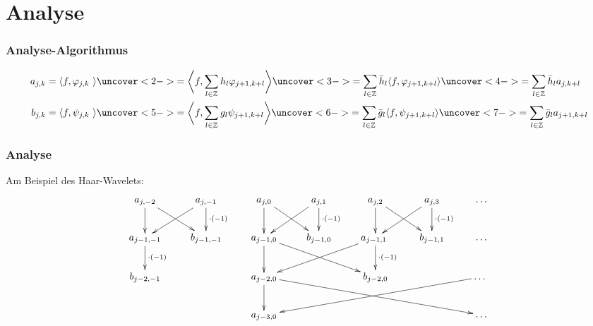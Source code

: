 %
%
%
\section{Analyse}

\begin{frame}
\frametitle{Analyse-Algorithmus}
\begin{align*}
a_{j,k} 
=
\langle f,\varphi_{j,k} \rangle
&\uncover<2->{=
\biggl\langle
f,\sum_{l\in\mathbb Z} h_l\varphi_{j+1,k+l}
\biggr\rangle}
\uncover<3->{=
\sum_{l\in\mathbb Z} \bar{h}_l\langle f, \varphi_{j+1,k+l}\rangle}
\uncover<4->{=
\sum_{l\in\mathbb Z} \bar{h}_la_{j,k+l}}
\\
b_{j,k} 
=
\langle f,\psi_{j,k} \rangle
&\uncover<5->{=
\biggl\langle
f,\sum_{l\in\mathbb Z} g_l\psi_{j+1,k+l}
\biggr\rangle}
\uncover<6->{=
\sum_{l\in\mathbb Z} \bar{g}_l\langle f, \psi_{j+1,k+l}\rangle}
\uncover<7->{=
\sum_{l\in\mathbb Z} \bar{g}_l a_{j+1,k+l}}
\end{align*}
\end{frame}

\begin{frame}
\frametitle{Analyse}
Am Beispiel des Haar-Wavelets:
\[
\xymatrix{
a_{j,-2} \ar[d] \ar[dr]
	&a_{j,-1} {\color{red}\ar[d]^{\cdot (-1)}} \ar[dl]
		&a_{j,0} \ar[d] \ar[dr]
			&a_{j,1} {\color{red}\ar[d]^{\cdot (-1)}} \ar[dl]
				&a_{j,2} \ar[d] \ar[dr]
					&a_{j,3} {\color{red}\ar[d]^{\cdot (-1)}} \ar[dl]
						&\dots
\\
a_{j-1,-1} {\color{red}\ar[d]^{\cdot(-1)}}
	&b_{j-1,-1}
		&a_{j-1,0}\ar[d] \ar[drr]
			&b_{j-1,0}
				&a_{j-1,1} {\color{red}\ar[d]^{\cdot (-1)}} \ar[dll]
					&b_{j-1,1}
						&\dots
\\
b_{j-2,-1} 
	&
		&a_{j-2,0} \ar[d] \ar[drrrr]
			&
				&b_{j-2,0}
					&
						&\dots \ar[dllll]
\\
	&
		&a_{j-3,0}
			&
				&
					&
						&\dots
}
\]
\end{frame}

